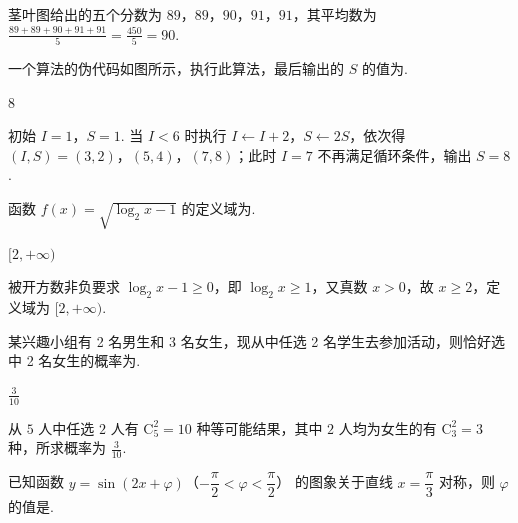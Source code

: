 \begin{solution}
茎叶图给出的五个分数为 \(89\)，\(89\)，\(90\)，\(91\)，\(91\)，其平均数为 \(\frac{89+89+90+91+91}{5}=\frac{450}{5}=90\).
\end{solution}

\begin{problem}
一个算法的伪代码如图所示，执行此算法，最后输出的 \(S\) 的值为\fillinblank{}.

\begin{center}
\end{center}
\end{problem}

\begin{answer}
\(8\)
\end{answer}

\begin{solution}
初始 \(I=1\)，\(S=1\). 当 \(I<6\) 时执行 \(I\leftarrow I+2\)，\(S\leftarrow2S\)，依次得 \((I,S)=(3,2)\)，\((5,4)\)，\((7,8)\)；此时 \(I=7\) 不再满足循环条件，输出 \(S=8\).
\end{solution}

\begin{problem}
函数 \(f(x)=\sqrt{\log_2 x-1}\) 的定义域为\fillinblank{}.
\end{problem}

\begin{answer}
\([2,+\infty)\)
\end{answer}

\begin{solution}
被开方数非负要求 \(\log_2x-1\geqslant0\)，即 \(\log_2x\geqslant1\)，又真数 \(x>0\)，故 \(x\geqslant2\)，定义域为 \([2,+\infty)\).
\end{solution}

\begin{problem}
某兴趣小组有 2 名男生和 3 名女生，现从中任选 2 名学生去参加活动，则恰好选中 2 名女生的概率为\fillinblank{}.
\end{problem}

\begin{answer}
\(\frac{3}{10}\)
\end{answer}

\begin{solution}
从 \(5\) 人中任选 \(2\) 人有 \(\mathrm C_5^2=10\) 种等可能结果，其中 \(2\) 人均为女生的有 \(\mathrm C_3^2=3\) 种，所求概率为 \(\frac{3}{10}\).
\end{solution}

\begin{problem}
已知函数 \(y=\sin(2x+\varphi)\)（\(-\dfrac{\pi}{2}<\varphi<\dfrac{\pi}{2}\)） 的图象关于直线 \(x=\dfrac{\pi}{3}\) 对称，则 \(\varphi\) 的值是\fillinblank{}.
\end{problem}

